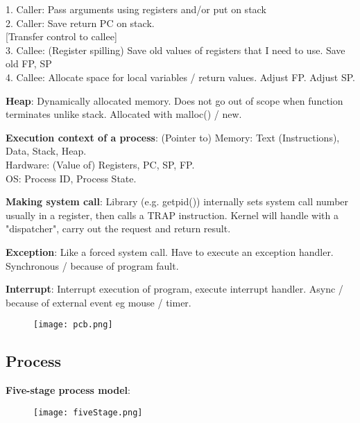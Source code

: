 \documentclass[a4paper,landscape]{article}
\newcommand{\rntopic}[1]{\vspace{-1.5em}\subsection*{#1}\vspace{-0.5em}}
\newcommand{\rnname}[1]{\textbf{#1}}
\begin{document}
\begin{multicols*}{4}
\begin{flatitemize}
1. Caller: Pass arguments using registers and/or put on stack\\
2. Caller: Save return PC on stack.\\
{[Transfer control to callee]}\\
3. Callee: (Register spilling) Save old values of registers that I need to use. Save old FP, SP\\
4. Callee: Allocate space for local variables / return values. Adjust FP. Adjust SP.
\item \rnname{Heap}: Dynamically allocated memory. Does not go out of scope when function terminates unlike stack. Allocated with malloc() / new.
\item \rnname{Execution context of a process}: (Pointer to) Memory: Text (Instructions), Data, Stack, Heap. \\ Hardware: (Value of) Registers, PC, SP, FP. \\ OS: Process ID, Process State.
\item \rnname{Making system call}: Library (e.g. getpid()) internally sets system call number usually in a register, then calls a TRAP instruction. Kernel will handle with a "dispatcher", carry out the request and return result. 
\item \rnname{Exception}: Like a forced system call. Have to execute an exception handler. Synchronous / because of program fault.
\item \rnname{Interrupt}: Interrupt execution of program, execute interrupt handler. Async / because of external event eg mouse / timer.
\vspace{-1.5em}
\begin{figure}[H]
  \texttt{[image: pcb.png]}
\end{figure}
\vspace{-1.5em}
\end{flatitemize}
\rntopic{Process}
\begin{flatitemize}
\item \rnname{Five-stage process model}: 
    \vspace{-1.5em}
    \begin{figure}[H]
      \texttt{[image: fiveStage.png]}
    \end{figure}
    \vspace{-1.5em}


\end{flatitemize}
\end{multicols*}
\end{document}

